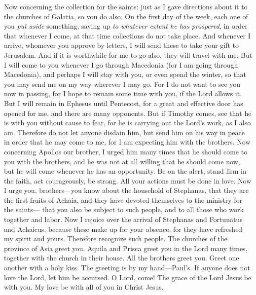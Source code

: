 \begin{biblechapter} %
 Now concerning the collection for the saints: just as I gave directions about it to the churches of Galatia, so you do also.
\verse On the first day of the week, each one of you \textit{put aside} something, saving up \textit{to whatever extent he has prospered}, in order that whenever I come, at that time collections do not take place.
\verse And whenever I arrive, whomever you approve by letters, I will send these to take your gift to Jerusalem.
\verse And if it is worthwhile for me to go also, they will travel with me.
 But I will come to you whenever I go through Macedonia (for I am going through Macedonia),
\verse and perhaps I will stay with you, or even spend the winter, so that you may send me on my way wherever I may go.
\verse For I do not want to see you now in passing, for I hope to remain some time with you, if the Lord allows it.
\verse But I will remain in Ephesus until Pentecost,
\verse for a great and effective door has opened for me, and there are many opponents.
\verse But if Timothy comes, see that he is with you without cause to fear, for he is carrying out the Lord’s work, as I also am.
\verse Therefore do not let anyone disdain him, but send him on his way in peace in order that he may come to me, for I am expecting him with the brothers.
\verse Now concerning Apollos our brother, I urged him many times that he should come to you with the brothers, and he was not at all willing that he should come now, but he will come whenever he has an opportunity.
 Be on the alert, stand firm in the faith, act courageously, be strong.
\verse All your actions must be done in love.
\verse Now I urge you, brothers—you know about the household of Stephanas, that they are the first fruits of Achaia, and they have devoted themselves to the ministry for the saints—
\verse that you also be subject to such people, and to all those who work together and labor.
\verse Now I rejoice over the arrival of Stephanas and Fortunatus and Achaicus, because these make up for your absence,
\verse for they have refreshed my spirit and yours. Therefore recognize such people.
 The churches of the province of Asia greet you. Aquila and Prisca greet you in the Lord many times, together with the church in their house.
\verse All the brothers greet you. Greet one another with a holy kiss.
\verse The greeting is by my hand—Paul’s.
\verse If anyone does not love the Lord, let him be accursed. O Lord, come!
\verse The grace of the Lord Jesus be with you.
\verse My love be with all of you in Christ Jesus.
\end{biblechapter}

